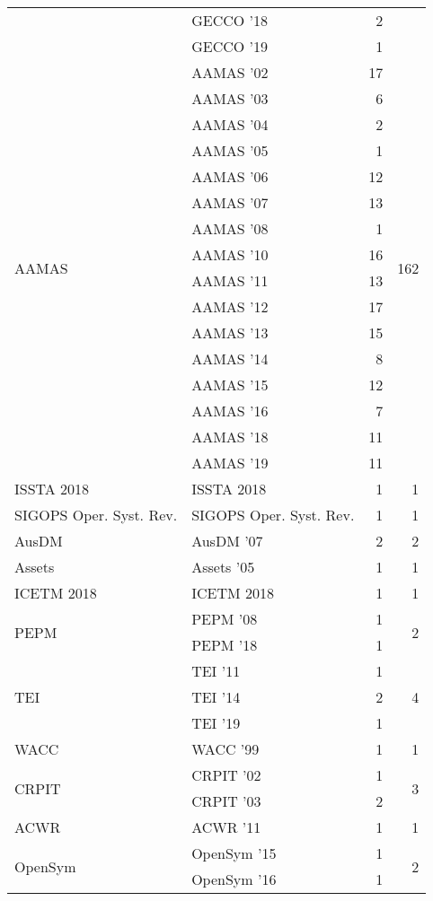 \begin{table*}[t]
\begin{tabular}{llrr}
& GECCO '18 & 2 &\\
& GECCO '19 & 1 &\\
\multirow{16}{*}{AAMAS } & AAMAS '02 & 17 & \multirow{16}{*}{162}\\
& AAMAS '03 & 6 &\\
& AAMAS '04 & 2 &\\
& AAMAS '05 & 1 &\\
& AAMAS '06 & 12 &\\
& AAMAS '07 & 13 &\\
& AAMAS '08 & 1 &\\
& AAMAS '10 & 16 &\\
& AAMAS '11 & 13 &\\
& AAMAS '12 & 17 &\\
& AAMAS '13 & 15 &\\
& AAMAS '14 & 8 &\\
& AAMAS '15 & 12 &\\
& AAMAS '16 & 7 &\\
& AAMAS '18 & 11 &\\
& AAMAS '19 & 11 &\\
\multirow{1}{*}{ISSTA 2018} & ISSTA 2018 & 1 & \multirow{1}{*}{1}\\
\multirow{1}{*}{SIGOPS Oper. Syst. Rev.} & SIGOPS Oper. Syst. Rev. & 1 & \multirow{1}{*}{1}\\
\multirow{1}{*}{AusDM } & AusDM '07 & 2 & \multirow{1}{*}{2}\\
\multirow{1}{*}{Assets } & Assets '05 & 1 & \multirow{1}{*}{1}\\
\multirow{1}{*}{ICETM 2018} & ICETM 2018 & 1 & \multirow{1}{*}{1}\\
\multirow{2}{*}{PEPM } & PEPM '08 & 1 & \multirow{2}{*}{2}\\
& PEPM '18 & 1 &\\
\multirow{3}{*}{TEI } & TEI '11 & 1 & \multirow{3}{*}{4}\\
& TEI '14 & 2 &\\
& TEI '19 & 1 &\\
\multirow{1}{*}{WACC } & WACC '99 & 1 & \multirow{1}{*}{1}\\
\multirow{2}{*}{CRPIT } & CRPIT '02 & 1 & \multirow{2}{*}{3}\\
& CRPIT '03 & 2 &\\
\multirow{1}{*}{ACWR } & ACWR '11 & 1 & \multirow{1}{*}{1}\\
\multirow{2}{*}{OpenSym } & OpenSym '15 & 1 & \multirow{2}{*}{2}\\
& OpenSym '16 & 1 &\\

\end{tabular}
\end{table*}
